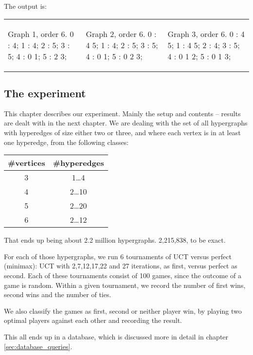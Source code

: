 The output is:

\begin{tabular}{|p{1.5in} | p{1.5in} | p{1.5in} |}
\begin{minipage}{1.5in}
\begin{datalisting}
Graph 1, order 6.
  0 : 4;
  1 : 4;
  2 : 5;
  3 : 5;
  4 : 0 1;
  5 : 2 3;

\end{datalisting}
\end{minipage}
&
\begin{minipage}{1.5in}
\begin{datalisting}
Graph 2, order 6.
  0 : 4 5;
  1 : 4;
  2 : 5;
  3 : 5;
  4 : 0 1;
  5 : 0 2 3;
\end{datalisting}
\end{minipage}
&
\begin{minipage}{1.5in}
\begin{datalisting}
Graph 3, order 6.
  0 : 4 5;
  1 : 4 5;
  2 : 4;
  3 : 5;
  4 : 0 1 2;
  5 : 0 1 3;
\end{datalisting}
\end{minipage}
\\
\end{tabular}


\subsection{The experiment}
\label{sec:experiment1}

This chapter describes our experiment. Mainly the setup and contents -- results are dealt with in the next chapter.
We are dealing with the set of all hypergraphs with hyperedges of size either two or three, and where each vertex is in at least one hyperedge, from the following classes:

\begin{tabular}{ c | c }
\#vertices & \#hyperedges \\ \hline
3&1\ldots4 \\ \hline
4&2\ldots10 \\ \hline
5&2\ldots20 \\ \hline
6&2\ldots12 \\ \hline
\end{tabular}

That ends up being about 2.2 million hypergraphs. 2,215,838, to be exact.

For each of those hypergraphs, we run 6 tournaments of UCT versus perfect (minimax): UCT with 2,7,12,17,22 and 27 iterations, as first, versus perfect as second.
Each of these tournaments consist of 100 games, since the outcome of a game is random. Within a given tournament, we record the number of first wins, second wins and the number of ties.

We also classify the games as first, second or neither player win, by playing two optimal players against each other and recording the result.

This all ends up in a database, which is discussed more in detail in chapter \ref{sec:database_queries}.
